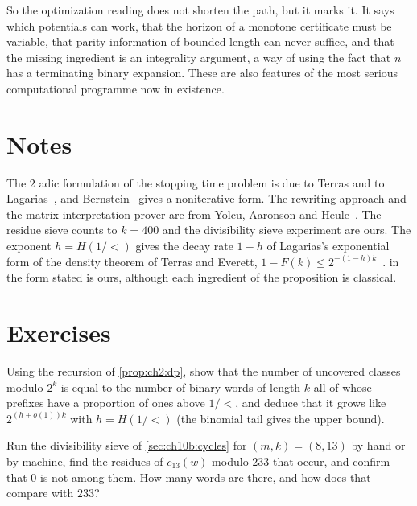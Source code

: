 So the optimization reading does not shorten the path, but it marks it. It says
which potentials can work, that the horizon of a monotone certificate must be variable, that parity
information of bounded length can never suffice, and that the missing ingredient is an
integrality argument, a way of using the fact that $n$ has a terminating binary
expansion. These are also features of the most serious computational
programme now in existence.

\section*{Notes}

The $2$ adic formulation of the stopping time problem is due to Terras and to
Lagarias~\cite{lagarias1985}, and Bernstein~\cite{bernstein1994} gives a
noniterative form. The rewriting approach and the matrix interpretation prover
are from Yolcu, Aaronson and Heule~\cite{yolcu2023}.
The residue sieve counts to $k=400$ and the divisibility sieve experiment are ours.
The exponent $h=H(1/\lt)$ gives the decay rate $1-h$ of Lagarias's exponential form of the density theorem of Terras and Everett, $1-F(k)\le2^{-(1-h)k}$~\cite[Theorem~D]{lagarias1985}.
 in the form stated is ours, although each ingredient of the proposition is classical.

\section*{Exercises}

\begin{exercise}
Using the recursion of \cref{prop:ch2:dp}, show that the number of uncovered
classes modulo $2^k$ is equal to the number of binary words of length $k$ all of
whose prefixes have a proportion of ones above $1/\lt$, and deduce that it grows
like $2^{(h+o(1))k}$ with $h=H(1/\lt)$ (the binomial tail gives the upper bound).
\end{exercise}

\begin{exercise}
Run the divisibility sieve of \cref{sec:ch10b:cycles} for $(m,k)=(8,13)$ by
hand or by machine, find the residues of $c_{13}(w)$ modulo $233$ that occur, and
confirm that $0$ is not among them. How many words are there, and how does that
compare with $233$?
\end{exercise}

